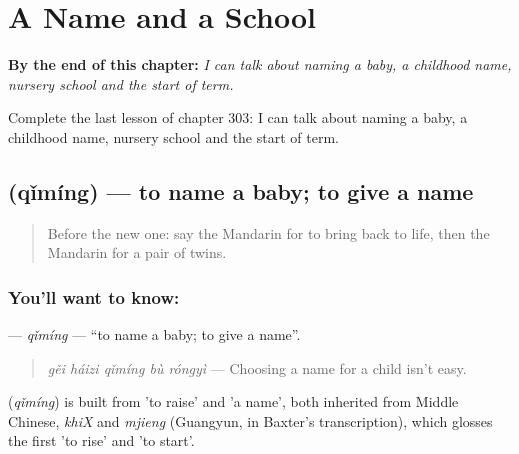 
\chapter{A Name and a School}
\label{ch:zh-a-name-and-a-school}

\begin{chapteropening}
\textbf{By the end of this chapter:} \emph{I can talk about naming a baby, a childhood name, nursery school and the start of term.}

Complete the last lesson of chapter 303: I can talk about naming a baby, a childhood name, nursery school and the start of term.
\end{chapteropening}

\section[\texorpdfstring{\zh{起名} (qǐmíng)}{起名 (qǐmíng)}]{ (qǐmíng) — to name a baby; to give a name}

\label{lesson:ZH-C303-qiming}



\begin{quote}
Before the new one: say the Mandarin for to bring back to life, then the Mandarin for a pair of twins.
\end{quote}

\subsection*{You'll want to know: }
\textbf{} — \emph{qǐmíng} — \textquotedblleft{}to name a baby; to give a name\textquotedblright{}.

\begin{quote}
\emph{gěi háizi qǐmíng bù róngyì} — Choosing a name for a child isn't easy.
\end{quote}

\begin{cousinweb}
\textbf{} (\emph{qǐmíng}) is built from  'to raise' and  'a name', both inherited from Middle Chinese, \emph{khiX} and \emph{mjieng} (Guangyun, in Baxter's transcription), which glosses the first 'to rise' and 'to start'.
\end{cousinweb}

